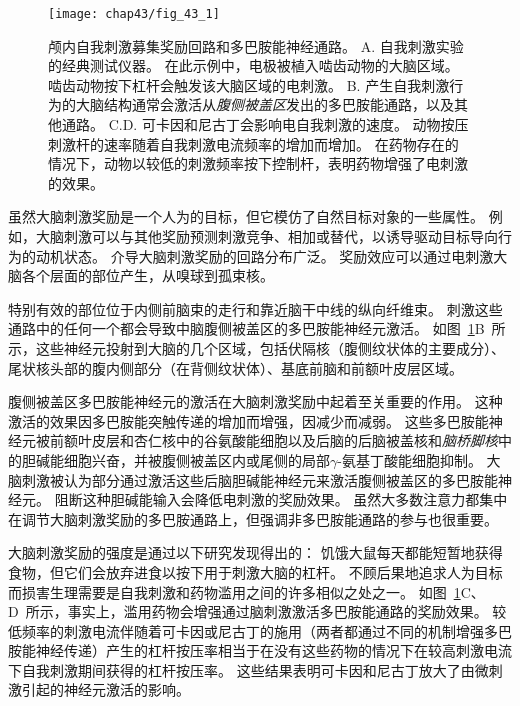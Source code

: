 \begin{figure}[htbp]
	\centering
	\texttt{[image: chap43/fig\_43\_1]}
	\caption{颅内自我刺激募集奖励回路和多巴胺能神经通路。
		A. 自我刺激实验的经典测试仪器。
		在此示例中，电极被植入啮齿动物的大脑区域。
		啮齿动物按下杠杆会触发该大脑区域的电刺激。
		B. 产生自我刺激行为的大脑结构通常会激活从\textit{腹侧被盖区}发出的多巴胺能通路，以及其他通路。
		C.D. 可卡因和尼古丁会影响电自我刺激的速度。
		动物按压刺激杆的速率随着自我刺激电流频率的增加而增加。
		在药物存在的情况下，动物以较低的刺激频率按下控制杆，表明药物增强了电刺激的效果。}
	\label{fig:43_1}
\end{figure}


虽然大脑刺激奖励是一个人为的目标，但它模仿了自然目标对象的一些属性。
例如，大脑刺激可以与其他奖励预测刺激竞争、相加或替代，以诱导驱动目标导向行为的动机状态。
介导大脑刺激奖励的回路分布广泛。
奖励效应可以通过电刺激大脑各个层面的部位产生，从嗅球到孤束核。


特别有效的部位位于内侧前脑束的走行和靠近脑干中线的纵向纤维束。
刺激这些通路中的任何一个都会导致中脑腹侧被盖区的多巴胺能神经元激活。
如图~\ref{fig:43_1}B~所示，这些神经元投射到大脑的几个区域，包括伏隔核（腹侧纹状体的主要成分）、尾状核头部的腹内侧部分（在背侧纹状体）、基底前脑和前额叶皮层区域。


腹侧被盖区多巴胺能神经元的激活在大脑刺激奖励中起着至关重要的作用。
这种激活的效果因多巴胺能突触传递的增加而增强，因减少而减弱。
这些多巴胺能神经元被前额叶皮层和杏仁核中的谷氨酸能细胞以及后脑的后脑被盖核和\textit{脑桥脚核}中的胆碱能细胞兴奋，并被腹侧被盖区内或尾侧的局部$\gamma$-氨基丁酸能细胞抑制。
大脑刺激被认为部分通过激活这些后脑胆碱能神经元来激活腹侧被盖区的多巴胺能神经元。
阻断这种胆碱能输入会降低电刺激的奖励效果。
虽然大多数注意力都集中在调节大脑刺激奖励的多巴胺通路上，但强调非多巴胺能通路的参与也很重要。


大脑刺激奖励的强度是通过以下研究发现得出的：
饥饿大鼠每天都能短暂地获得食物，但它们会放弃进食以按下用于刺激大脑的杠杆。
不顾后果地追求人为目标而损害生理需要是自我刺激和药物滥用之间的许多相似之处之一。
如图~\ref{fig:43_1}C、D~所示，事实上，滥用药物会增强通过脑刺激激活多巴胺能通路的奖励效果。
较低频率的刺激电流伴随着可卡因或尼古丁的施用（两者都通过不同的机制增强多巴胺能神经传递）产生的杠杆按压率相当于在没有这些药物的情况下在较高刺激电流下自我刺激期间获得的杠杆按压率。
这些结果表明可卡因和尼古丁放大了由微刺激引起的神经元激活的影响。



